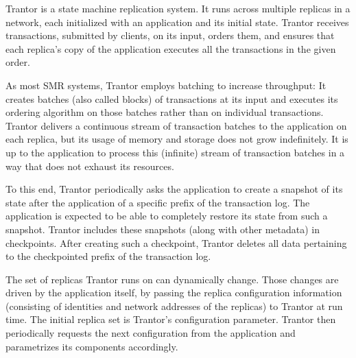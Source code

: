\documentclass{article}
\begin{document}
Trantor is a state machine replication system.
It runs across multiple replicas in a network, each initialized with an application and its initial state.
Trantor receives transactions, submitted by clients, on its input, orders them,
and ensures that each replica's copy of the application executes all the transactions in the given order.

As most SMR systems, Trantor employs batching to increase throughput:
It creates batches (also called blocks) of transactions at its input
and executes its ordering algorithm on those batches rather than on individual transactions.
Trantor delivers a continuous stream of transaction batches to the application on each replica,
but its usage of memory and storage does not grow indefinitely.
It is up to the application to process this (infinite) stream of transaction batches in a way that does not exhaust its resources.

To this end, Trantor periodically asks the application to create a snapshot of its state after the application of a specific prefix of the transaction log.
The application is expected to be able to completely restore its state from such a snapshot.
Trantor includes these snapshots (along with other metadata) in checkpoints.
After creating such a checkpoint, Trantor deletes all data pertaining to the checkpointed prefix of the transaction log.

The set of replicas Trantor runs on can dynamically change.
Those changes are driven by the application itself, by passing the replica configuration information
(consisting of identities and network addresses of the replicas) to Trantor at run time.
The initial replica set is Trantor’s configuration parameter.
Trantor then periodically requests the next configuration from the application and parametrizes its components accordingly.
\end{document}
